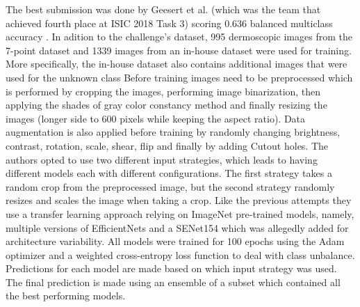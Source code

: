     The best submission was done by Geesert et al. (which was the team that achieved fourth place at ISIC 2018 Task 3) scoring 0.636 balanced multiclass accuracy \cite{isic2019first}. 
    In adition to the challenge's dataset, 995 dermoscopic images from the 7-point dataset \cite{?} and 1339 images from an in-house dataset were used for training. More specifically, the in-house dataset also contains additional images that were used for the unknown class  
    Before training images need to be preprocessed which is performed by cropping the images, performing image binarization, then applying the shades of gray color constancy method \cite{shadesgray} and finally resizing the images (longer side to 600 pixels while keeping the aspect ratio). 
    Data augmentation is also applied before training by randomly changing brightness, contrast, rotation, scale, shear, flip and finally by adding  Cutout \cite{cutout} holes.  
    The authors opted to use two different input strategies, which leads to having different models each with different configurations. The first strategy takes a random crop from the preprocessed image, but the second strategy randomly resizes and scales the image when taking a crop. 
    Like the previous attempts they use a transfer learning approach relying on ImageNet pre-trained models, namely, multiple versions of EfficientNets and a SENet154 which was allegedly added for architecture variability. All models were trained for 100 epochs using the Adam optimizer \cite{adam} and a weighted cross-entropy loss function to deal with class unbalance.
    Predictions for each model are made based on which input strategy was used. The final prediction is made using an ensemble of a subset which contained all the best performing models. \par
    
